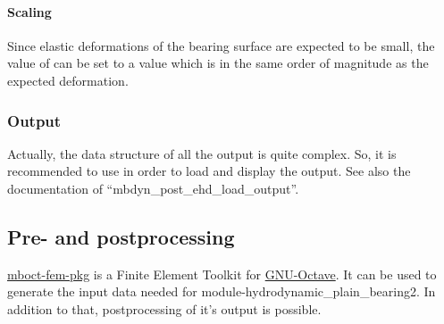 \paragraph{Scaling}
Since elastic deformations of the bearing surface are expected to be small, the value of  can be set to a value which is in the same order of magnitude as the expected deformation.
\subsubsection{Output}
Actually, the data structure of all the output is quite complex. So, it is recommended to use  in order to load and display the output. See also the documentation of ``mbdyn\_post\_ehd\_load\_output''.
\subsection{Pre- and postprocessing}
\href{https://github.com/octave-user/mboct-fem-pkg}{mboct-fem-pkg} is a Finite Element Toolkit for \href{https://gnu.org/software/octave}{GNU-Octave}. It can be used to generate the input data needed for module-hydrodynamic\_plain\_bearing2. In addition to that, postprocessing of it's output is possible.
